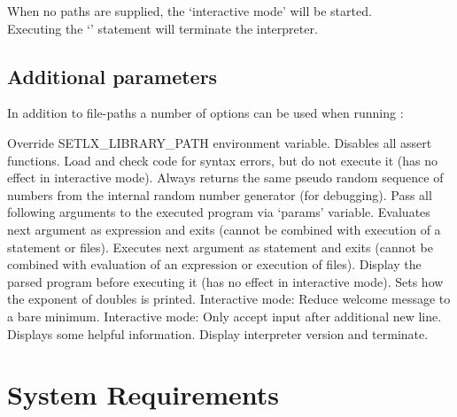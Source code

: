 When no paths are supplied, the `interactive mode' will be started.\\
Executing the `' statement will terminate the interpreter.

\subsection*{Additional parameters}

In addition to file-paths a number of options can be used when running \setlX{}:

\begin{itemize}
	      {Override SETLX\_LIBRARY\_PATH environment variable.}
	      {Disables all assert functions.}
	      {Load and check code for syntax errors, but do not execute it (has no effect in interactive mode).}
	      {Always returns the same pseudo random sequence of numbers from the internal random number generator (for debugging).}
	      {Pass all following arguments to the executed program via `params' variable.}
	      {Evaluates next argument as expression and exits (cannot be combined with execution of a statement or files).}
	      {Executes next argument as statement and exits (cannot be combined with evaluation of an expression or execution of files).}
          {Display the parsed program before executing it (has no effect in interactive mode).}
          {Sets how the exponent of doubles is printed.}
	      {Interactive mode: Reduce welcome message to a bare minimum.}
	      {Interactive mode: Only accept input after additional new line.}
	      {Displays some helpful information.}
          {Display interpreter version and terminate.}
\end{itemize}

\section{System Requirements}

